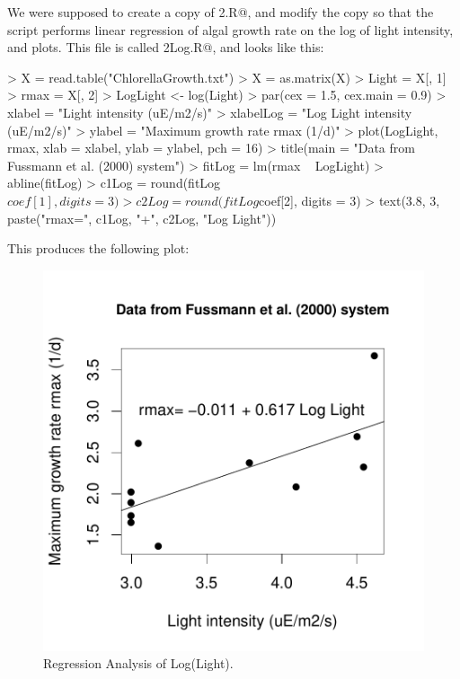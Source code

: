\documentclass[11pt, oneside, reqno]{article}
\begin{document}
We were supposed to create a copy of \verb@Intro2.R@, and modify the copy so that the script performs linear regression of algal growth rate on the log of light intensity, and plots. This file is called \verb@Intro2Log.R@, and looks like this:

\begin{Schunk}
\begin{Sinput}
> X = read.table("ChlorellaGrowth.txt")
> X = as.matrix(X)
> Light = X[, 1]
> rmax = X[, 2]
> LogLight <- log(Light)
> par(cex = 1.5, cex.main = 0.9)
> xlabel = "Light intensity (uE/m2/s)"
> xlabelLog = "Log Light intensity (uE/m2/s)"
> ylabel = "Maximum growth rate rmax (1/d)"
> plot(LogLight, rmax, xlab = xlabel, ylab = ylabel, pch = 16)
> title(main = "Data from Fussmann et al. (2000) system")
> fitLog = lm(rmax ~ LogLight)
> abline(fitLog)
> c1Log = round(fitLog$coef[1], digits = 3)
> c2Log = round(fitLog$coef[2], digits = 3)
> text(3.8, 3, paste("rmax=", c1Log, "+", c2Log, "Log Light"))
\end{Sinput}
\end{Schunk}

This produces the following plot:

\begin{figure}
\begin{center}
\includegraphics{exercises-fig2}
\end{center}
\caption{Regression Analysis of Log(Light).}
\label{fig:two}
\end{figure}
\eans
\end{document}
